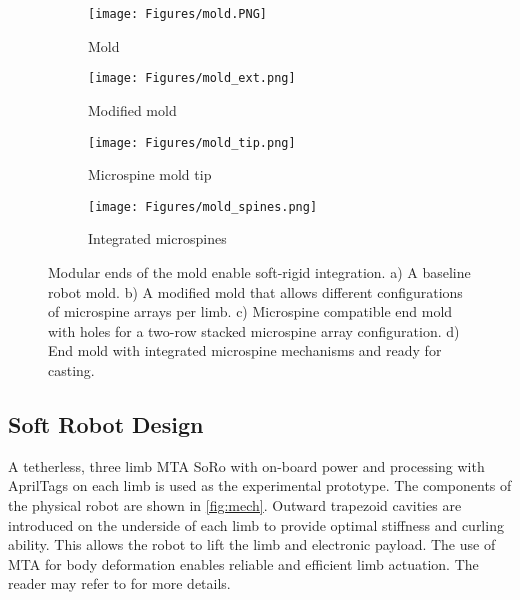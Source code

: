 \begin{figure}[h]
    \centering
    \begin{subfigure}{0.4\linewidth}
         \centering
         \texttt{[image: Figures/mold.PNG]}
         \caption{Mold}
         \label{fig:base}\vspace{-20pt}
     \end{subfigure}
     \begin{subfigure}{0.55\linewidth}
         \centering
         \texttt{[image: Figures/mold\_ext.png]}
         \caption{Modified mold}
         \label{fig:one}\vspace{-20pt}
     \end{subfigure}
     \begin{subfigure}{0.45\linewidth}
         \centering
         \texttt{[image: Figures/mold\_tip.png]}
         \caption{Microspine mold tip}
         \label{fig:two}
     \end{subfigure}
     \begin{subfigure}{0.45\linewidth}
         \centering
         \texttt{[image: Figures/mold\_spines.png]}
         \caption{Integrated microspines}
         \label{fig:two}
     \end{subfigure}
    \caption{Modular ends of the mold enable soft-rigid integration. a) A baseline robot mold. b) A modified mold that allows different configurations of microspine arrays per limb. c) Microspine compatible end mold with holes for a two-row stacked microspine array configuration. d) End mold with integrated microspine mechanisms and ready for casting.}
    \label{fig:totalMold}
\end{figure}



\subsection{Soft Robot Design}
A tetherless, three limb MTA SoRo with on-board power and processing with AprilTags on each limb is used as the experimental prototype. The components of the physical robot are shown in \Fig \ref{fig:mech}. %
Outward trapezoid cavities are introduced on the underside of each limb to provide optimal stiffness and curling ability. This allows the robot to lift the limb and electronic payload. The use of MTA for body deformation enables reliable and efficient limb actuation. The reader may refer to \cite{freeman_topology_2023} for more details.


